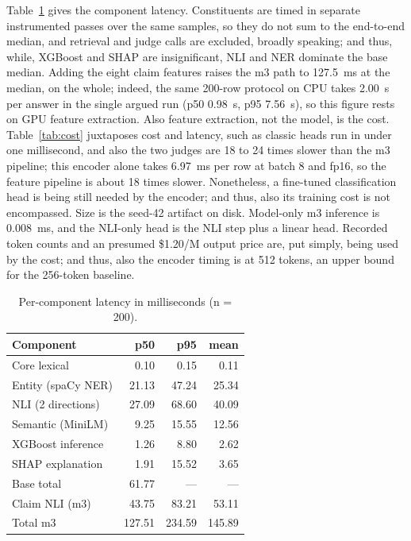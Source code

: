 \documentclass[a4paper,fleqn]{cas-sc}
\begin{document}
Table~\ref{tab:latency} gives the component latency. Constituents are timed in separate instrumented passes over the same samples, so they do not sum to the end-to-end median, and retrieval and judge calls are excluded, broadly speaking; and thus, while, XGBoost and SHAP are insignificant, NLI and NER dominate the base median. Adding the eight claim features raises the m3 path to 127.5~ms at the median, on the whole; indeed, the same 200-row protocol on CPU takes 2.00~s per answer in the single argued run (p50 0.98~s, p95 7.56~s), so this figure rests on GPU feature extraction. Also feature extraction, not the model, is the cost. Table~\ref{tab:cost} juxtaposes cost and latency, such as classic heads run in under one millisecond, and also the two judges are 18 to 24 times slower than the m3 pipeline; this encoder alone takes 6.97~ms per row at batch 8 and fp16, so the feature pipeline is about 18 times slower. Nonetheless, a fine-tuned classification head is being still needed by the encoder; and thus, also its training cost is not encompassed. Size is the seed-42 artifact on disk. Model-only m3 inference is 0.008~ms, and the NLI-only head is the NLI step plus a linear head. Recorded token counts and an presumed \$1.20/M output price are, put simply, being used by the cost; and thus, also the encoder timing is at 512 tokens, an upper bound for the 256-token baseline.

\begin{table}[pos=htbp]
  \centering
  \caption{Per-component latency in milliseconds (n = 200).}
  \label{tab:latency}
  \begin{tabular}{lrrr}
    \toprule
    \textbf{Component} & \textbf{p50} & \textbf{p95} & \textbf{mean} \\
    \midrule
    Core lexical       & 0.10         & 0.15         & 0.11          \\
    Entity (spaCy NER) & 21.13        & 47.24        & 25.34         \\
    NLI (2 directions) & 27.09        & 68.60        & 40.09         \\
    Semantic (MiniLM)  & 9.25         & 15.55        & 12.56         \\
    XGBoost inference  & 1.26         & 8.80         & 2.62          \\
    SHAP explanation   & 1.91         & 15.52        & 3.65          \\
    Base total         & 61.77        & ---          & ---           \\
    Claim NLI (m3)     & 43.75        & 83.21        & 53.11         \\
    Total m3           & 127.51       & 234.59       & 145.89        \\
    \bottomrule
  \end{tabular}
\end{table}
\end{document}
